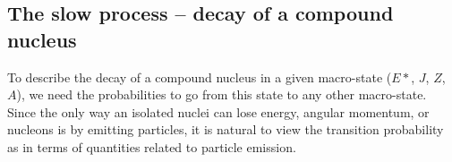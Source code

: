 \subsection{The slow process -- decay of a compound nucleus}
To describe the decay of a compound nucleus in a given macro-state ($E*$, $J$, $Z$, $A$), we need the probabilities to go from this state to any other macro-state. Since the only way an isolated nuclei can lose energy, angular momentum, or nucleons is by emitting particles, it is natural to view the transition probability as in terms of quantities related to particle emission.

